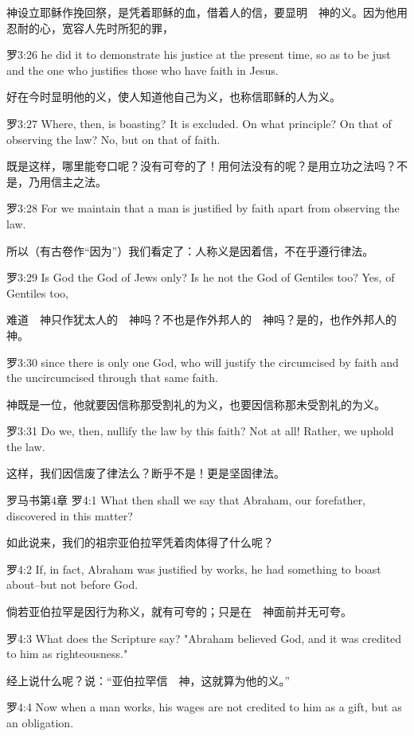 \documentclass[a4paper,11pt,onecolumn,twoside]{ctexart}
\begin{document}
\begin{multicols}{2}
 神设立耶稣作挽回祭，是凭着耶稣的血，借着人的信，要显明　神的义。因为他用忍耐的心，宽容人先时所犯的罪，


 罗3:26
 he did it to demonstrate his justice at the present time, so as to be just and the one who justifies those who have faith in Jesus.

 好在今时显明他的义，使人知道他自己为义，也称信耶稣的人为义。


 罗3:27
 Where, then, is boasting? It is excluded. On what principle? On that of observing the law? No, but on that of faith.

 既是这样，哪里能夸口呢？没有可夸的了！用何法没有的呢？是用立功之法吗？不是，乃用信主之法。


 罗3:28
 For we maintain that a man is justified by faith apart from observing the law.

 所以（有古卷作“因为”）我们看定了：人称义是因着信，不在乎遵行律法。


 罗3:29
 Is God the God of Jews only? Is he not the God of Gentiles too? Yes, of Gentiles too,

 难道　神只作犹太人的　神吗？不也是作外邦人的　神吗？是的，也作外邦人的　神。


 罗3:30
 since there is only one God, who will justify the circumcised by faith and the uncircumcised through that same faith.

 神既是一位，他就要因信称那受割礼的为义，也要因信称那未受割礼的为义。


 罗3:31
 Do we, then, nullify the law by this faith? Not at all! Rather, we uphold the law.

 这样，我们因信废了律法么？断乎不是！更是坚固律法。


 罗马书第4章
 罗4:1
 What then shall we say that Abraham, our forefather, discovered in this matter?

 如此说来，我们的祖宗亚伯拉罕凭着肉体得了什么呢？


 罗4:2
 If, in fact, Abraham was justified by works, he had something to boast about--but not before God.

 倘若亚伯拉罕是因行为称义，就有可夸的；只是在　神面前并无可夸。


 罗4:3
 What does the Scripture say? "Abraham believed God, and it was credited to him as righteousness."

 经上说什么呢？说：“亚伯拉罕信　神，这就算为他的义。”


 罗4:4
 Now when a man works, his wages are not credited to him as a gift, but as an obligation.


\end{multicols}
\end{document}
